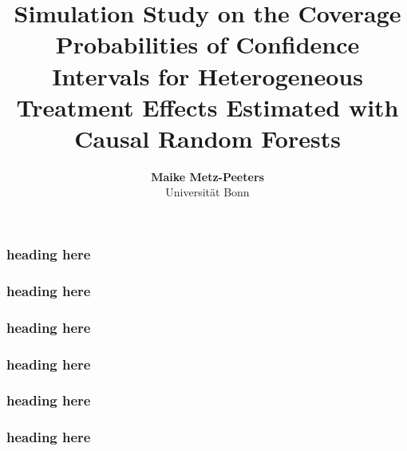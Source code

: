 \documentclass[11pt]{beamer}
\begin{document}
\title{ Simulation Study on the Coverage Probabilities of Confidence Intervals for Heterogeneous Treatment Effects Estimated with Causal Random Forests}

\author[Maike Metz-Peeters]
{
{\bf Maike Metz-Peeters}\\
{\small Universität Bonn}\\[1ex]
}


\begin{frame}
    \titlepage
    \note{~}
\end{frame}



\begin{frame}
    \frametitle{heading here}
    \citet{GaudeckerEconProjectTemplates}
    
\end{frame}


\begin{frame}
    \frametitle{heading here}

     

\end{frame}



\begin{frame}
    \frametitle{heading here}
    
    

\end{frame}


\begin{frame}
    \frametitle{heading here}
    
    

\end{frame}


\begin{frame}
    \frametitle{heading here}
    
    

\end{frame}


\begin{frame}
    \frametitle{heading here}
    
    

\end{frame}
\end{document}
